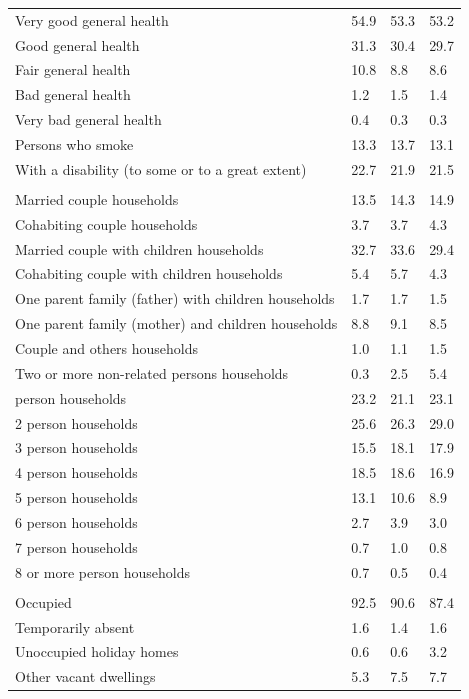 \documentclass{article}
\begin{document}
\begin{table}[h]
\begin{tabular}{KTTT}
Very good general health & 54.9& 53.3& 53.2\\
Good general health & 31.3& 30.4& 29.7\\
Fair general health & 10.8&  8.8&  8.6\\
Bad general health & 1.2& 1.5& 1.4\\
Very bad general health & 0.4& 0.3& 0.3\\
    \hline
Persons who smoke & 13.3& 13.7& 13.1\\
    \hline
With a disability (to some or to a great extent) & 22.7& 21.9& 21.5\\
\hline
    \\ 
    \hline
Married couple households & 13.5& 14.3& 14.9\\
Cohabiting couple households & 3.7& 3.7& 4.3\\
Married couple with children households & 32.7& 33.6& 29.4\\
Cohabiting couple with children households & 5.4& 5.7& 4.3\\
One parent family (father) with  children households & 1.7& 1.7& 1.5\\
One parent family (mother) and children households & 8.8& 9.1& 8.5\\
Couple and others households  & 1.0& 1.1& 1.5\\
Two or more non-related persons households & 0.3& 2.5& 5.4\\
     person households & 23.2& 21.1& 23.1\\
2 person households & 25.6& 26.3& 29.0\\
3 person households & 15.5& 18.1& 17.9\\
4 person households & 18.5& 18.6& 16.9\\
5 person households & 13.1& 10.6&  8.9\\
6 person households & 2.7& 3.9& 3.0\\
7 person households & 0.7& 1.0& 0.8\\
8 or more person households & 0.7& 0.5& 0.4\\
\hline
    \\ 
    \hline
Occupied & 92.5& 90.6& 87.4\\
Temporarily absent & 1.6& 1.4& 1.6\\
Unoccupied holiday homes & 0.6& 0.6& 3.2\\
Other vacant dwellings & 5.3& 7.5& 7.7\\
\hline
\end{tabular}
\end{table}
\end{document}
